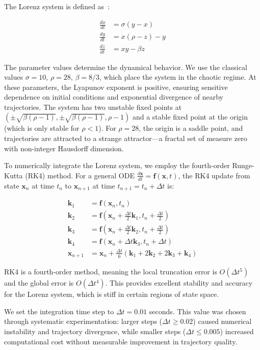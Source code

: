 \documentclass[12pt,a4paper,oneside]{report}
\begin{document}
The Lorenz system is defined as~\cite{lorenz1963}:

\begin{align}
\frac{dx}{dt} &= \sigma(y - x) \\
\frac{dy}{dt} &= x(\rho - z) - y \\
\frac{dz}{dt} &= xy - \beta z
\end{align}

The parameter values determine the dynamical behavior. We use the classical values $\sigma = 10$, $\rho = 28$, $\beta = 8/3$, which place the system in the chaotic regime. At these parameters, the Lyapunov exponent is positive, ensuring sensitive dependence on initial conditions and exponential divergence of nearby trajectories. The system has two unstable fixed points at $(\pm\sqrt{\beta(\rho-1)}, \pm\sqrt{\beta(\rho-1)}, \rho-1)$ and a stable fixed point at the origin (which is only stable for $\rho < 1$). For $\rho = 28$, the origin is a saddle point, and trajectories are attracted to a strange attractor—a fractal set of measure zero with non-integer Hausdorff dimension.

To numerically integrate the Lorenz system, we employ the fourth-order Runge-Kutta (RK4) method. For a general ODE $\frac{d\mathbf{x}}{dt} = \mathbf{f}(\mathbf{x}, t)$, the RK4 update from state $\mathbf{x}_n$ at time $t_n$ to $\mathbf{x}_{n+1}$ at time $t_{n+1} = t_n + \Delta t$ is:

\begin{align}
\mathbf{k}_1 &= \mathbf{f}(\mathbf{x}_n, t_n) \\
\mathbf{k}_2 &= \mathbf{f}(\mathbf{x}_n + \frac{\Delta t}{2}\mathbf{k}_1, t_n + \frac{\Delta t}{2}) \\
\mathbf{k}_3 &= \mathbf{f}(\mathbf{x}_n + \frac{\Delta t}{2}\mathbf{k}_2, t_n + \frac{\Delta t}{2}) \\
\mathbf{k}_4 &= \mathbf{f}(\mathbf{x}_n + \Delta t \mathbf{k}_3, t_n + \Delta t) \\
\mathbf{x}_{n+1} &= \mathbf{x}_n + \frac{\Delta t}{6}(\mathbf{k}_1 + 2\mathbf{k}_2 + 2\mathbf{k}_3 + \mathbf{k}_4)
\end{align}

RK4 is a fourth-order method, meaning the local truncation error is $O(\Delta t^5)$ and the global error is $O(\Delta t^4)$. This provides excellent stability and accuracy for the Lorenz system, which is stiff in certain regions of state space.

We set the integration time step to $\Delta t = 0.01$ seconds. This value was chosen through systematic experimentation: larger steps ($\Delta t \geq 0.02$) caused numerical instability and trajectory divergence, while smaller steps ($\Delta t \leq 0.005$) increased computational cost without measurable improvement in trajectory quality.
\end{document}
